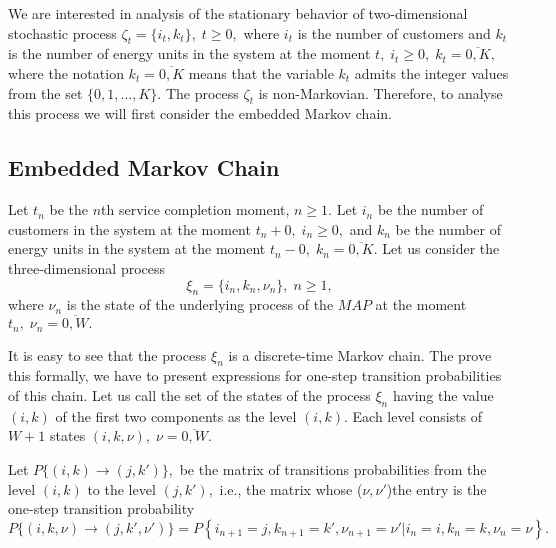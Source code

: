 \documentclass[runningheads]{llncs}
\begin{document}
We are interested in analysis of the stationary behavior of two-dimensional stochastic process $\zeta_t=\{i_{t}, k_{t}\},\; t \ge 0,$
where $i_t$ is the number of customers  and $k_t$ is the number of energy units in the system at the moment $t,\; i_t \ge 0,\; k_t=\overline{0,K},$ where the notation $k_t=\overline{0,K}$ means that the variable $k_t$ admits the integer values from the set $\{0,1,\dots,K\}.$ The process $\zeta_t$ is non-Markovian. Therefore, to analyse this process we will first consider the embedded Markov chain.

\subsection{Embedded Markov Chain}

Let $t_n$ be the $n$th service completion moment, $n \ge 1.$ Let $i_n$ be the number of customers in the system at the moment $t_n+0,\; i_n \ge 0,$ and $k_n$ be the number of energy units in the system at the moment $t_n-0,\; k_n=\overline{0,K}.$ Let us consider the three-dimensional process
$$
\xi_n=\{i_n,k_n,\nu_n\},\; n \ge1,
$$
where $\nu_n$ is the state of the underlying process of the $MAP$ at the moment $t_n,\; \nu_n=\overline{0,W}.$

It is easy to see that the process $\xi_n$ is a discrete-time Markov chain. The prove this formally, we have to present expressions for one-step transition probabilities of this chain. Let us call the set of the states of the process $\xi_n$ having the value $(i,k)$ of the first two components as the level $(i,k).$ Each level consists of $W+1$ states $(i,k,\nu),\; \nu=\overline{0,W}.$

Let $P\{(i,k) \to (j, k')\},$ be the matrix of transitions probabilities from the level $(i,k)$ to the level $(j, k'),$ i.e., the matrix whose ($\nu,\nu'$)the entry is the one-step transition probability  $$P\{ (i ,k, \nu) \to (j, k', \nu')\} =P\left\{i_{n+1} = j, k_{n+1} = k', \nu_{n+1} = \nu' |i_{n} = i, k_{n} = k, \nu_{n} = \nu \right\}.$$
\end{document}

